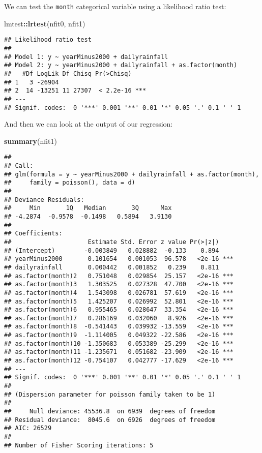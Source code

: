 \documentclass[]{book}
\newenvironment{Shaded}{\begin{snugshade}}{\end{snugshade}}
\newcommand{\KeywordTok}[1]{\textcolor[rgb]{0.13,0.29,0.53}{\textbf{#1}}}
\newcommand{\OperatorTok}[1]{\textcolor[rgb]{0.81,0.36,0.00}{\textbf{#1}}}
\newcommand{\NormalTok}[1]{#1}
\begin{document}
We can test the \texttt{month} categorical variable using a likelihood
ratio test:

\begin{Shaded}
\begin{Highlighting}[]
\NormalTok{lmtest}\OperatorTok{::}\KeywordTok{lrtest}\NormalTok{(nfit0, nfit1)}
\end{Highlighting}
\end{Shaded}

\begin{verbatim}
## Likelihood ratio test
## 
## Model 1: y ~ yearMinus2000 + dailyrainfall
## Model 2: y ~ yearMinus2000 + dailyrainfall + as.factor(month)
##   #Df LogLik Df Chisq Pr(>Chisq)    
## 1   3 -26904                        
## 2  14 -13251 11 27307  < 2.2e-16 ***
## ---
## Signif. codes:  0 '***' 0.001 '**' 0.01 '*' 0.05 '.' 0.1 ' ' 1
\end{verbatim}

And then we can look at the output of our regression:

\begin{Shaded}
\begin{Highlighting}[]
\KeywordTok{summary}\NormalTok{(nfit1)}
\end{Highlighting}
\end{Shaded}

\begin{verbatim}
## 
## Call:
## glm(formula = y ~ yearMinus2000 + dailyrainfall + as.factor(month), 
##     family = poisson(), data = d)
## 
## Deviance Residuals: 
##     Min       1Q   Median       3Q      Max  
## -4.2874  -0.9578  -0.1498   0.5894   3.9130  
## 
## Coefficients:
##                     Estimate Std. Error z value Pr(>|z|)    
## (Intercept)        -0.003849   0.028882  -0.133    0.894    
## yearMinus2000       0.101654   0.001053  96.578   <2e-16 ***
## dailyrainfall       0.000442   0.001852   0.239    0.811    
## as.factor(month)2   0.751048   0.029854  25.157   <2e-16 ***
## as.factor(month)3   1.303525   0.027328  47.700   <2e-16 ***
## as.factor(month)4   1.543098   0.026781  57.619   <2e-16 ***
## as.factor(month)5   1.425207   0.026992  52.801   <2e-16 ***
## as.factor(month)6   0.955465   0.028647  33.354   <2e-16 ***
## as.factor(month)7   0.286169   0.032060   8.926   <2e-16 ***
## as.factor(month)8  -0.541443   0.039932 -13.559   <2e-16 ***
## as.factor(month)9  -1.114005   0.049322 -22.586   <2e-16 ***
## as.factor(month)10 -1.350683   0.053389 -25.299   <2e-16 ***
## as.factor(month)11 -1.235671   0.051682 -23.909   <2e-16 ***
## as.factor(month)12 -0.754107   0.042777 -17.629   <2e-16 ***
## ---
## Signif. codes:  0 '***' 0.001 '**' 0.01 '*' 0.05 '.' 0.1 ' ' 1
## 
## (Dispersion parameter for poisson family taken to be 1)
## 
##     Null deviance: 45536.8  on 6939  degrees of freedom
## Residual deviance:  8045.6  on 6926  degrees of freedom
## AIC: 26529
## 
## Number of Fisher Scoring iterations: 5
\end{verbatim}
\end{document}
